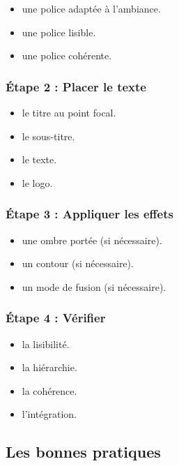 \begin{itemize}
    \item {} une police adaptée à l'ambiance.
    \item {} une police lisible.
    \item {} une police cohérente.
\end{itemize}

\subsubsection{Étape 2 : Placer le texte}

\begin{itemize}
    \item {} le titre au point focal.
    \item {} le sous-titre.
    \item {} le texte.
    \item {} le logo.
\end{itemize}

\subsubsection{Étape 3 : Appliquer les effets}

\begin{itemize}
    \item {} une ombre portée (si nécessaire).
    \item {} un contour (si nécessaire).
    \item {} un mode de fusion (si nécessaire).
\end{itemize}

\subsubsection{Étape 4 : Vérifier}

\begin{itemize}
    \item {} la lisibilité.
    \item {} la hiérarchie.
    \item {} la cohérence.
    \item {} l'intégration.
\end{itemize}

\subsection{Les bonnes pratiques}

